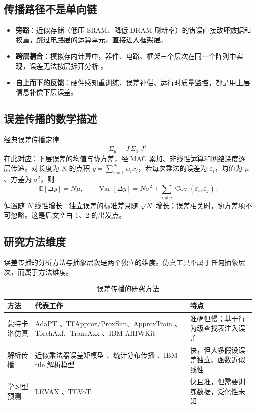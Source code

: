 \documentclass[11pt,a4paper]{ctexart}
\begin{document}
\subsection{传播路径不是单向链}

\begin{itemize}[leftmargin=*]
  \item \textbf{旁路}：近似存储（低压 SRAM、降低 DRAM 刷新率）的错误直接改坏数据和权重，跳过电路层的运算单元，直接进入框架层。
  \item \textbf{跨层耦合}：模拟存内计算中，器件、电路、框架三个层次在同一个阵列中实现，误差无法按层拆开分析 \cite{thuaccuracy}。
  \item \textbf{自上而下的反馈}：硬件感知重训练、误差补偿、运行时质量监控，都是用上层信息补偿下层误差。
\end{itemize}

\subsection{误差传播的数学描述}

经典误差传播定律
\begin{equation}
\Sigma_y = J\,\Sigma_x\,J^{\mathsf T}
\end{equation}
在此对应：下层误差的均值与协方差，经 MAC 累加、非线性运算和网络深度逐层传递。对长度为 $N$ 的点积 $y=\sum_{i=1}^{N} w_i x_i$，若每次乘法的误差为 $\varepsilon_i$，均值为 $\mu$、方差为 $\sigma^2$，则
\begin{equation}
\mathbb{E}[\Delta y] = N\mu,\qquad
\operatorname{Var}[\Delta y] = N\sigma^2 + \sum_{i\neq j}\operatorname{Cov}(\varepsilon_i,\varepsilon_j).
\end{equation}
偏置随 $N$ 线性增长，独立误差的标准差只随 $\sqrt{N}$ 增长；误差相关时，协方差项不可忽略。这是后文空白 1、2 的出发点。

\subsection{研究方法维度}

误差传播的分析方法与抽象层次是两个独立的维度。仿真工具不属于任何抽象层次，而属于方法维度。

\begin{table}[h]
\centering
\small
\begin{tabularx}{\textwidth}{@{}lXX@{}}
\toprule
方法 & 代表工作 & 特点 \\
\midrule
蒙特卡洛仿真 & AdaPT \cite{adapt}、TFApprox/ProxSim、ApproxTrain \cite{approxtrain}、TorchAxf、TransAxx \cite{transaxx}、IBM AIHWKit & 准确但慢；基于行为级查找表注入误差 \\
解析传播 & 近似乘法器误差矩模型 \cite{amierr}、统计分布传播 \cite{ubcprop}、IBM tile 解析模型 \cite{ibmtile} & 快，但大多假设误差独立、函数近似线性 \\
学习型预测 & LEVAX \cite{levax}、TEVoT \cite{tevot} & 快且准，但需要训练数据，泛化性未知 \\
\bottomrule
\end{tabularx}
\caption{误差传播的研究方法}
\label{tab:methods}
\end{table}
\end{document}
